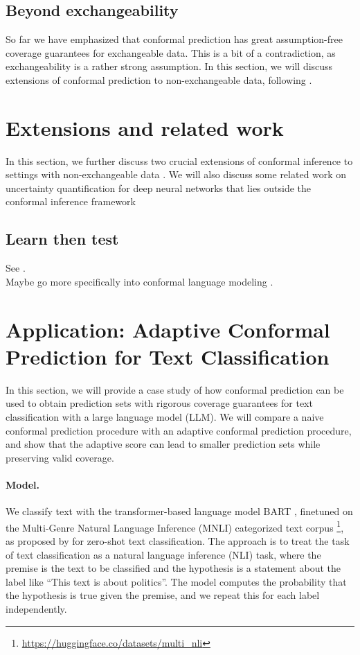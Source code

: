 \documentclass[a4paper, 12pt]{article}
\begin{document}
\subsection{Beyond exchangeability}
\label{sec:nonexchangeable}
So far we have emphasized that conformal prediction has great assumption-free coverage guarantees for exchangeable data. This is a bit of a contradiction, as exchangeability is a rather strong assumption. In this section, we will discuss extensions of conformal prediction to non-exchangeable data, following \textcite{barberConformalPredictionExchangeability2023}.


\section{Extensions and related work}
In this section, we further discuss two crucial extensions of conformal inference
to settings with non-exchangeable data \autocite{gibbsAdaptiveConformalInference2021, tibshiraniConformalPredictionCovariate2020}.
We will also discuss some related work on uncertainty quantification for deep neural networks that lies outside the conformal inference framework

\subsection{Learn then test}
See \autocite{angelopoulosLearnThenTest2022}. \\
Maybe go more specifically into conformal language modeling \autocite{quachConformalLanguageModeling2023}.

\section{Application: Adaptive Conformal Prediction for Text Classification}
In this section, we will provide a case study of how conformal prediction can be used to obtain
prediction sets with rigorous coverage guarantees for text classification with a large language model (LLM). We will
compare a naive conformal prediction procedure with an adaptive conformal prediction procedure, and show that the
adaptive score can lead to smaller prediction sets while preserving valid coverage.

\paragraph*{Model.} We classify text with the transformer-based language model BART \autocite{lewisBARTDenoisingSequencetoSequence2019},
finetuned on the Multi-Genre Natural Language Inference (MNLI) categorized text corpus \footnote{\url{https://huggingface.co/datasets/multi_nli}},
as proposed by \textcite{yinBenchmarkingZeroshotText2019} for zero-shot text classification. The approach is to treat the task of text classification as a natural language inference (NLI) task, where the premise is the text to be classified and the hypothesis is a statement about the label like ``This text is about politics''. The model computes the probability that the hypothesis is true given the premise, and we repeat this for each label independently.
\end{document}
